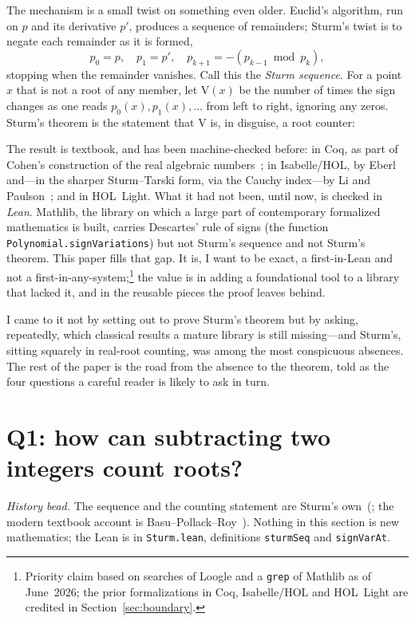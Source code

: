 \documentclass[11pt]{article}
\newcommand{\lean}[1]{\texttt{#1}}
\newcommand{\V}{\mathrm{V}}
\newcommand{\keyeq}[1]{\begin{center}\keybox{$\displaystyle #1$}\end{center}}
\begin{document}
The mechanism is a small twist on something even older. Euclid's algorithm, run on $p$ and its
derivative $p'$, produces a sequence of remainders; Sturm's twist is to negate each remainder as
it is formed,
\[
  p_0=p,\quad p_1=p',\quad p_{k+1}=-(p_{k-1}\bmod p_k),
\]
stopping when the remainder vanishes. Call this the \emph{Sturm sequence}. For a point $x$ that is
not a root of any member, let $\V(x)$ be the number of times the sign changes as one reads
$p_0(x),p_1(x),\dots$ from left to right, ignoring any zeros. Sturm's theorem is the statement
that $\V$ is, in disguise, a root counter:
\keyeq{\#\{\text{distinct real roots of }p\text{ in }(a,b]\}\;=\;\V(a)-\V(b).}

The result is textbook, and has been machine-checked before: in Coq, as part of Cohen's
construction of the real algebraic numbers~\cite{cohen}; in Isabelle/HOL, by Eberl~\cite{eberl}
and---in the sharper Sturm--Tarski form, via the Cauchy index---by Li and
Paulson~\cite{litarski,libudan}; and in HOL~Light. What it had not been, until now, is checked in
\emph{Lean}. Mathlib, the library on which a large part of contemporary formalized mathematics is
built, carries Descartes' rule of signs (the function \lean{Polynomial.signVariations}) but not
Sturm's sequence and not Sturm's theorem. This paper fills that gap. It is, I want to be exact, a
first-in-Lean and not a first-in-any-system;\footnote{Priority claim based on searches of Loogle
and a \lean{grep} of Mathlib as of June~2026; the prior formalizations in Coq, Isabelle/HOL and
HOL~Light are credited in Section~\ref{sec:boundary}.} the value is in adding a foundational tool to
a library that lacked it, and in the reusable pieces the proof leaves behind.

I came to it not by setting out to prove Sturm's theorem but by asking, repeatedly, which
classical results a mature library is still missing---and Sturm's, sitting squarely in real-root
counting, was among the most conspicuous absences. The rest of the paper is the road from the
absence to the theorem, told as the four questions a careful reader is likely to ask in turn.

\section{Q1: how can subtracting two integers count roots?}\label{sec:q1}

\emph{History bead.} The sequence and the counting statement are Sturm's
own~(\cite{sturm}; the modern textbook account is Basu--Pollack--Roy~\cite{bpr}). Nothing in
this section is new mathematics; the Lean is in \lean{Sturm.lean}, definitions \lean{sturmSeq}
and \lean{signVarAt}.
\end{document}
